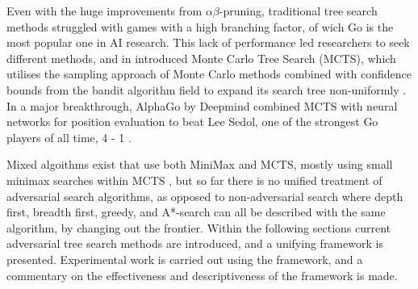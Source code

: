 Even with the huge improvements from $\alpha\beta$-pruning, traditional tree search methods struggled with games with a high branching factor, of wich Go is the most popular one in AI research. This lack of performance led researchers to seek different methods, and in \citeyear{Coulom2006} \citeauthor{Coulom2006} introduced Monte Carlo Tree Search (MCTS), which utilises the sampling approach of Monte Carlo methods combined with confidence bounds from the bandit algorithm field to expand its search tree non-uniformly \cite{Coulom2006}. In a major breakthrough, AlphaGo by Deepmind combined MCTS with neural networks for position evaluation to beat Lee Sedol, one of the strongest Go players of all time, 4 - 1 \cite{Silver2016}.

Mixed algoithms exist that use both MiniMax and MCTS, mostly using small minimax searches within MCTS \cite{Baier2014}, but so far there is no unified treatment of adversarial search algorithms, as opposed to non-adversarial search where depth first, breadth first, greedy, and A*-search can all be described with the same algorithm, by changing out the frontier. Within the following sections current adversarial tree search methods are introduced, and a unifying framework is presented. Experimental work is carried out using the framework, and a commentary on the effectiveness and descriptiveness of the framework is made.
